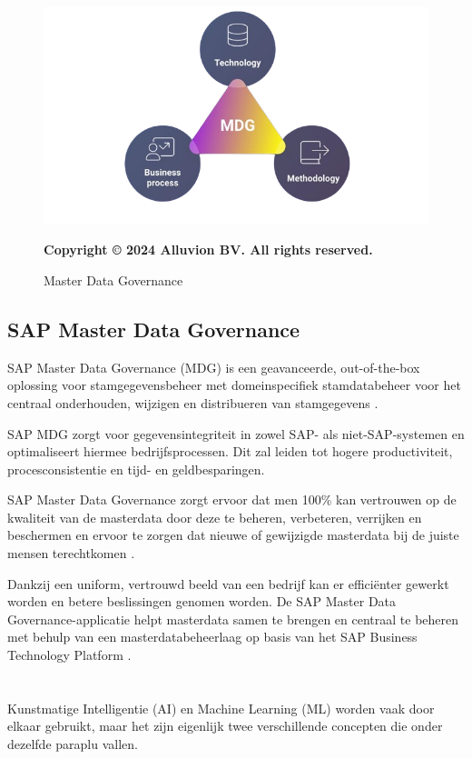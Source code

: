 \begin{figure}[htbp]
  \centering
  \includegraphics[scale=0.5]{../images/AlluvionMDG.png}
  \caption{Master Data Governance}
  \small\textbf{Copyright © 2024 Alluvion BV. All rights reserved. \autocite{Alluvion}}
\end{figure}

\subsection{SAP Master Data Governance}
SAP Master Data Governance (MDG) is een geavanceerde, out-of-the-box oplossing voor stamgegevensbeheer met domeinspecifiek stamdatabeheer voor het centraal onderhouden, wijzigen en distribueren van stamgegevens \autocite{Avelon}. 

SAP MDG zorgt voor gegevensintegriteit in zowel SAP- als niet-SAP-systemen en optimaliseert hiermee bedrijfsprocessen. Dit zal leiden tot hogere productiviteit, procesconsistentie en tijd- en geldbesparingen.

SAP Master Data Governance zorgt ervoor dat men 100\% kan vertrouwen op de kwaliteit van de masterdata door deze te beheren, verbeteren, verrijken en beschermen en ervoor te zorgen dat nieuwe of gewijzigde masterdata bij de juiste mensen terechtkomen \autocite{Alluvion}.

Dankzij een uniform, vertrouwd beeld van een bedrijf kan er efficiënter gewerkt worden en betere beslissingen genomen worden. De SAP Master Data Governance-applicatie helpt masterdata samen te brengen en centraal te beheren met behulp van een masterdatabeheerlaag op basis van het SAP Business Technology Platform \autocite{SAPMDG}.

\section{}%
\label{sec:ai}
Kunstmatige Intelligentie (AI) en Machine Learning (ML) worden vaak door elkaar gebruikt, maar het zijn eigenlijk twee verschillende concepten die onder dezelfde paraplu vallen.

